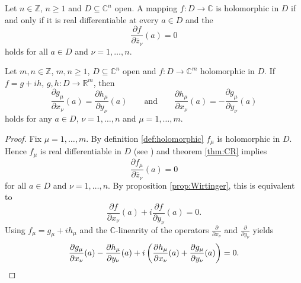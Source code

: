 \begin{theorem}
Let $n \in \mathbb{Z}$, $n \geq 1$ and $D \subseteq \mathbb{C}^n$ open. A mapping $f: D \to \mathbb{C}$ is holomorphic in $D$ if and only if it is real differentiable at every $a \in D$ and the 
\begin{equation}
\frac{\partial f}{\partial \overline{z}_\nu}(a) = 0 
\end{equation}
\noindent holds for all $a \in D$ and $\nu = 1,\dots,n$.
\label{thm:CR}
\end{theorem}

\begin{corollary}
Let $m,n \in \mathbb{Z}$, $m,n \geq 1$, $D \subseteq \mathbb{C}^n$ open and $f: D \to \mathbb{C}^m$ holomorphic in $D$. If $f = g + ih$, $g,h : D \to \mathbb{R}^m$, then 
\begin{equation}
\boxed{\frac{\partial g_\mu}{\partial x_\nu}(a) = \frac{\partial h_\mu}{\partial y_\nu}(a) \qquad \text{and} \qquad \frac{\partial h_\mu}{\partial x_\nu}(a) = -\frac{\partial g_\mu}{\partial y_\nu}(a)}
\end{equation} 
\noindent holds for any $a \in D$, $\nu = 1,\dots,n$ and $\mu = 1,\dots,m$.
\label{cor:CRreal}
\end{corollary}

\begin{proof}
Fix $\mu = 1,\dots,m$. By definition \ref{def:holomorphic} $f_\mu$ is holomorphic in $D$. Hence $f_\mu$ is real differentiable in $D$ (see \cite[27]{grauert:complex_manifolds:2010}) and theorem \ref{thm:CR} implies
\begin{equation*}
\frac{\partial f_\mu}{\partial \overline{z}_\nu}(a) = 0
\end{equation*}
\noindent for all $a \in D$ and $\nu = 1,\dots,n$. By proposition \ref{prop:Wirtinger}, this is equivalent to 
\begin{equation*}
\frac{\partial f}{\partial x_\nu}(a) + i \frac{\partial f}{\partial y_\nu}(a) = 0.
\end{equation*}
Using $f_\mu = g_\mu + i h_\mu$ and the $\mathbb{C}$-linearity of the operators $\frac{\partial}{\partial x_\nu}$ and $\frac{\partial}{\partial y_\nu}$ yields
\begin{equation*}
\frac{\partial g_\mu}{\partial x_\nu}(a) - \frac{\partial h_\mu}{\partial y_\nu}(a) + i \del[3]{ \frac{\partial h_\mu}{\partial x_\nu}(a) + \frac{\partial g_\mu}{\partial y_\nu}(a)} = 0.
\end{equation*}
\end{proof}

